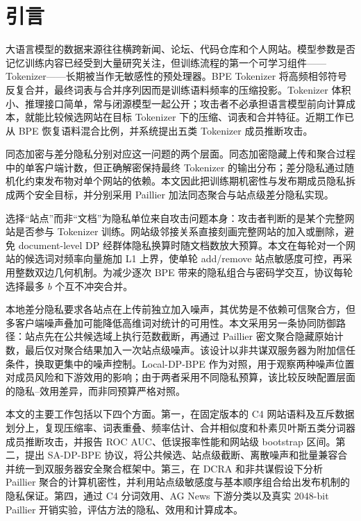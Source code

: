 \section{引言}

大语言模型的数据来源往往横跨新闻、论坛、代码仓库和个人网站。模型参数是否记忆训练内容已经受到大量研究关注，但训练流程的第一个可学习组件——Tokenizer——长期被当作无敏感性的预处理器。BPE Tokenizer 将高频相邻符号反复合并，最终词表与合并序列因而是训练语料频率的压缩投影。Tokenizer 体积小、推理接口简单，常与闭源模型一起公开；攻击者不必承担语言模型前向计算成本，就能比较候选网站在目标 Tokenizer 下的压缩、词表和合并特征。近期工作已从 BPE 恢复语料混合比例\cite{hayase2024mixture}，并系统提出五类 Tokenizer 成员推断攻击\cite{tong2026tokenizermia}。

同态加密与差分隐私分别对应这一问题的两个层面。同态加密隐藏上传和聚合过程中的单客户端计数，但正确解密保持最终 Tokenizer 的输出分布；差分隐私通过随机化约束发布物对单个网站的依赖。本文因此把训练期机密性与发布期成员隐私拆成两个安全目标，并分别采用 Paillier 加法同态聚合与站点级差分隐私实现。

选择“站点”而非“文档”为隐私单位来自攻击问题本身：攻击者判断的是某个完整网站是否参与 Tokenizer 训练。网站级邻接关系直接刻画完整网站的加入或删除，避免 document-level DP 经群体隐私换算时随文档数放大预算。本文在每轮对一个网站的候选词对频率向量施加 L1 上界，使单轮 add/remove 站点敏感度可控，再采用整数双边几何机制。为减少逐次 BPE 带来的隐私组合与密码学交互，协议每轮选择最多 $b$ 个互不冲突合并。

本地差分隐私要求各站点在上传前独立加入噪声，其优势是不依赖可信聚合方，但多客户端噪声叠加可能降低高维词对统计的可用性。本文采用另一条协同防御路径：站点先在公共候选域上执行范数截断，再通过 Paillier 密文聚合隐藏原始计数，最后仅对聚合结果加入一次站点级噪声。该设计以非共谋双服务器为附加信任条件，换取更集中的噪声控制。Local-DP-BPE 作为对照，用于观察两种噪声位置对成员风险和下游效用的影响；由于两者采用不同隐私预算，该比较反映配置层面的隐私--效用差异，而非同预算严格对照。

本文的主要工作包括以下四个方面。第一，在固定版本的 C4 网站语料及互斥数据划分上，复现压缩率、词表重叠、频率估计、合并相似度和朴素贝叶斯五类分词器成员推断攻击，并报告 ROC AUC、低误报率性能和网站级 bootstrap 区间。第二，提出 SA-DP-BPE 协议，将公共候选、站点级截断、离散噪声和批量兼容合并统一到双服务器安全聚合框架中。第三，在 DCRA 和非共谋假设下分析 Paillier 聚合的计算机密性，并利用站点级敏感度与基本顺序组合给出发布机制的隐私保证。第四，通过 C4 分词效用、AG News 下游分类以及真实 2048-bit Paillier 开销实验，评估方法的隐私、效用和计算成本。
